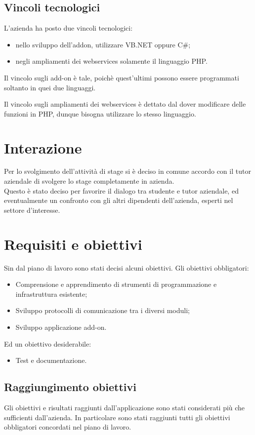 \subsection{Vincoli tecnologici}
L'azienda ha posto due vincoli tecnologici:
\begin{itemize}
	\item nello sviluppo dell'addon, utilizzare VB.NET oppure C\#;
	\item negli ampliamenti dei webservices solamente il linguaggio PHP.
\end{itemize}
Il vincolo sugli add-on è tale, poichè quest'ultimi possono essere programmati soltanto in quei due linguaggi.

Il vincolo sugli ampliamenti dei webservices è dettato dal dover modificare delle funzioni in PHP, dunque bisogna utilizzare lo stesso linguaggio.
\section{Interazione}
Per lo svolgimento dell'attività di stage si è deciso in comune accordo con il tutor aziendale di svolgere lo stage completamente in azienda.\\
Questo è stato deciso per favorire il dialogo tra studente e tutor aziendale, ed eventualmente un confronto con gli altri dipendenti dell'azienda, esperti nel settore d'interesse.
\section{Requisiti e obiettivi}
Sin dal piano di lavoro sono stati decisi alcuni obiettivi.
Gli obiettivi obbligatori:
\begin{itemize}
	\item Comprensione e apprendimento di strumenti di programmazione e infrastruttura esistente;
	\item Sviluppo protocolli di comunicazione tra i diversi moduli;
	\item Sviluppo applicazione add-on.
\end{itemize}
Ed un obiettivo desiderabile:
\begin{itemize}
	\item Test e documentazione.
\end{itemize}
\subsection{Raggiungimento obiettivi}
Gli obiettivi e risultati raggiunti dall'applicazione sono stati considerati più che sufficienti dall'azienda.
In particolare sono stati raggiunti tutti gli obiettivi obbligatori concordati nel piano di lavoro.

